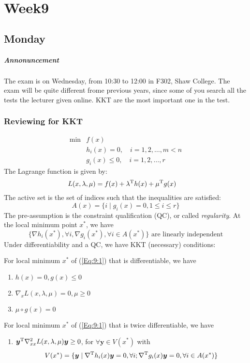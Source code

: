 
\chapter{Week9}
\section{Monday}
\paragraph{Annonuncement}
The exam is on Wednesday, from 10:30 to 12:00 in F302, Shaw College. The exam will be quite different frome previous years, since some of you search all the tests the lecturer given online. KKT are the most important one in the test.
\subsection{Reviewing for KKT}
\begin{equation}\label{Eq:9:1}
\begin{array}{ll}
\min&f(x)\\
&h_i(x)=0,\quad i=1,2,\dots,m<n\\
&g_i(x)\le0,\quad i=1,2,\dots,r
\end{array}
\end{equation}
The Lagrange function is given by:
\begin{align*}
L(x,\lambda,\mu)&=f(x)+\lambda^{\mathrm T} h(x)+\mu^{\mathrm T} g(x)
\end{align*}
The active set is the set of indices such that the inequalities are satisfied:
\[
A(x)=\{i\mid g_i(x)=0, 1\le i\le r\}
\]
The pre-assumption is the constraint qualification (QC), or called \emph{regularity}. At the local minimum point $x^*$, we have
\[
\{\nabla h_i(x^*),\forall i, \nabla g_i(x^*),\forall i\in A(x^*)\}\mbox{ are linearly independent}
\]
Under differentiability and a QC, we have KKT (necessary) conditions:
\begin{proposition}
For local minimum $x^*$ of (\ref{Eq:9:1}) that is differentiable, we have
\begin{enumerate}
\item
$h(x)=0,g(x)\le0$
\item
$\nabla_xL(x,\lambda,\mu)=0,\mu\ge0$
\item
$\mu\circ g(x)=0$
\end{enumerate}
\end{proposition}
\begin{proposition}
For local minimum $x^*$ of (\ref{Eq:9:1}) that is twice differentiable, we have
\begin{enumerate}
\item
$\bm y^{\mathrm T}\nabla^2_{xx}L(x,\lambda,\mu)\bm y\ge0$, for $\forall \bm y\in V(x^*)$ with
\[
V(x^*)=\{\bm y\mid \nabla^{\mathrm T} h_i(x)\bm y=0,\forall i; \nabla^{\mathrm T} g_i(x)\bm y=0, \forall i\in A(x^*)\}
\]

\end{enumerate}
\end{proposition}

